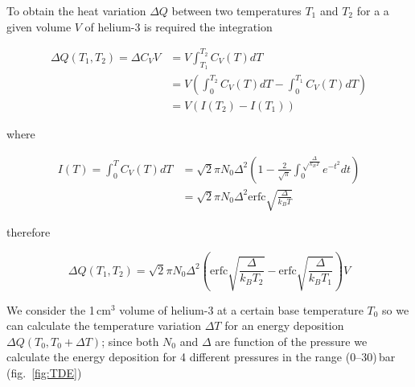 \documentclass[a4paper,12pt]{article}
\begin{document}
To obtain the heat variation $\Delta Q$ between two temperatures $T_1$ and $T_2$ for a a given volume $V$ of helium-3 is required the integration

\begin{align}
\Delta Q (T_1,T_2) = \Delta C_V V & = V \int_{T_1}^{T_2} C_V(T)dT \\
                                  & = V \left( \int_{0}^{T_2} C_V(T)dT - \int_{0}^{T_1} C_V(T)dT \right)\\
                                  & = V \left( I(T_2) - I(T_1) \right)  
\end{align}

where

\begin{align}
I(T) = \int_{0}^{T} C_V(T)dT & = \sqrt{2} \pi N_0 \varDelta^2 \left( 1 - \frac{2}{\sqrt{\pi}}\int_{0}^{\sqrt \frac{\varDelta}{k_BT}} e^{-t^2} dt \right) \\ 
                             & =  \sqrt{2}\pi N_0\varDelta^2 \mathrm{erfc} \sqrt{\frac{\varDelta}{k_BT} } 
\end{align}

therefore

\begin{equation}
\Delta Q (T_1,T_2) = \sqrt{2}\pi N_0\varDelta^2 \left( \mathrm{erfc}\sqrt{\frac{\varDelta}{k_BT_2}} - \mathrm{erfc}\sqrt{\frac{\varDelta}{k_BT_1}} \right)V
\end{equation}

We consider the 1\,cm$^3$ volume of helium-3 at a certain base temperature $T_0$ so we can calculate the temperature variation $\Delta T$ for an energy deposition $\Delta Q(T_0,T_0+\Delta T)$;
since both $N_0$ and $\varDelta$ are function of the pressure we calculate the energy deposition for 4 different pressures in the range (0--30)\,bar (fig.~\ref{fig:TDE})
\end{document}

